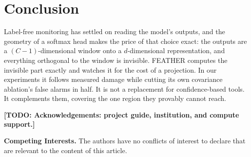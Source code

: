 \documentclass[acmsmall,screen]{acmart}
\newcommand{\todo}[1]{\textbf{[TODO: #1]}}
\theoremstyle{acmdefinition}
\begin{document}
\section{Conclusion}
\label{sec:conclusion}

Label-free monitoring has settled on reading the model's outputs, and the
geometry of a softmax head makes the price of that choice exact: the outputs
are a $(C-1)$-dimensional window onto a $d$-dimensional representation, and
everything orthogonal to the window is invisible. FEATHER computes the
invisible part exactly and watches it for the cost of a projection. In our
experiments it follows measured damage while cutting its own covariance
ablation's false alarms in half. It is not a replacement for confidence-based
tools. It complements them, covering the one region they provably cannot
reach.

\begin{acks}
\todo{Acknowledgements: project guide, institution, and compute support.}
\end{acks}

\par\medskip\noindent\textbf{Competing Interests.} The authors have no
conflicts of interest to declare that are relevant to the content of this
article.



\end{document}
